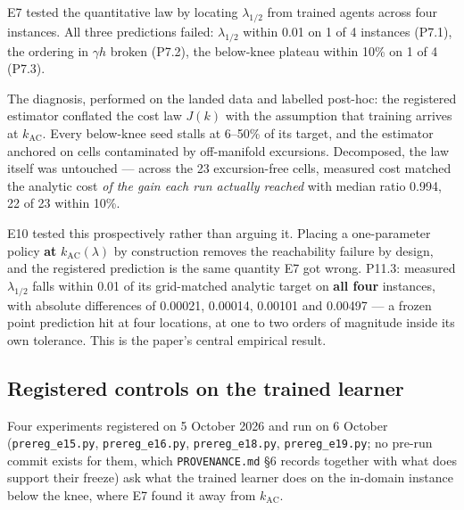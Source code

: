 E7 tested the quantitative law by locating \(\lambda_{1/2}\) from
trained agents across four instances. All three predictions failed:
\(\lambda_{1/2}\) within 0.01 on 1 of 4 instances (P7.1), the ordering
in \(\gamma h\) broken (P7.2), the below-knee plateau within 10\% on 1
of 4 (P7.3).

The diagnosis, performed on the landed data and labelled post-hoc: the
registered estimator conflated the cost law \(J(k)\) with the assumption
that training arrives at \(k_{\text{AC}}\). Every below-knee seed stalls
at 6--50\% of its target, and the estimator anchored on cells
contaminated by off-manifold excursions. Decomposed, the law itself was
untouched --- across the 23 excursion-free cells, measured cost matched
the analytic cost \emph{of the gain each run actually reached} with
median ratio 0.994, 22 of 23 within 10\%.

E10 tested this prospectively rather than arguing it. Placing a
one-parameter policy \textbf{at} \(k_{\text{AC}}(\lambda)\) by
construction removes the reachability failure by design, and the
registered prediction is the same quantity E7 got wrong. P11.3: measured
\(\lambda_{1/2}\) falls within 0.01 of its grid-matched analytic target
on \textbf{all four} instances, with absolute differences of 0.00021,
0.00014, 0.00101 and 0.00497 --- a frozen point prediction hit at four
locations, at one to two orders of magnitude inside its own tolerance.
This is the paper's central empirical result.

\subsection{Registered controls on the trained learner}
\label{sec:controls}

Four experiments registered on 5 October 2026 and run on 6 October
(\texttt{prereg\_e15.py}, \texttt{prereg\_e16.py}, \texttt{prereg\_e18.py},
\texttt{prereg\_e19.py}; no pre-run commit exists for them, which
\texttt{PROVENANCE.md} \S6 records together with what does support their
freeze) ask what the trained learner does on the in-domain instance below the
knee, where E7 found it away from $k_{\mathrm{AC}}$.

